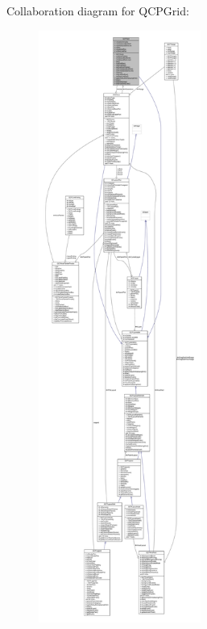 Collaboration diagram for Q\+C\+P\+Grid\+:\nopagebreak
\begin{figure}[H]
\begin{center}
\leavevmode
\includegraphics[height=550pt]{class_q_c_p_grid__coll__graph}
\end{center}
\end{figure}
